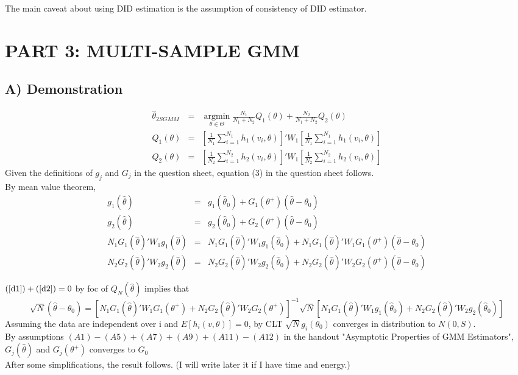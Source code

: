 \documentclass[11pt]{article}
\begin{document}
The main caveat about using DID estimation is the assumption of consistency of DID estimator. 
\section*{PART 3: MULTI-SAMPLE GMM}
\subsection*{A) Demonstration}
\begin{eqnarray}
\hat{\theta}_{2SGMM} &=& \underset{\theta \in \Theta}{\operatorname{argmin}} \frac{N_{1}}{N_{1}+N_{2}} Q_{1}(\theta)+ \frac{N_{2}}{N_{1}+N_{2}} Q_{2}(\theta) \nonumber \\
Q_{1}(\theta)        &=& \left[\frac{1}{N_{1}} \sum\limits_{i=1}^{N_{1}} h_{1}(v_{i},\theta)\right]' W_{1}\left[\frac{1}{N_{1}} \sum\limits_{i=1}^{N_{1}} h_{1}(v_{i},\theta)\right] \nonumber \\
Q_{2}(\theta)        &=& \left[\frac{1}{N_{2}} \sum\limits_{i=1}^{N_{2}} h_{2}(v_{i},\theta)\right]' W_{1}\left[\frac{1}{N_{2}} \sum\limits_{i=1}^{N_{2}} h_{2}(v_{i},\theta)\right] \nonumber 
\end{eqnarray}
Given the definitions of $g_{j}$ and $G_{j}$ in the question sheet, equation (3) in the question sheet follows. 
\\
By mean value theorem, 
\begin{eqnarray}
g_{1}(\hat{\theta}) &=& g_{1}(\hat{\theta}_{0}) + G_{1}(\theta^+)(\hat{\theta}-\theta_{0}) \nonumber \\
g_{2}(\hat{\theta}) &=& g_{2}(\hat{\theta}_{0}) + G_{2}(\theta^+)(\hat{\theta}-\theta_{0})
\nonumber \\
N_{1}G_{1}(\hat{\theta})'W_{1}g_{1}(\hat{\theta}) &=& N_{1}G_{1}(\hat{\theta})'W_{1}g_{1}(\hat{\theta}_{0}) + N_{1}G_{1}(\hat{\theta})'W_{1}G_{1}(\theta^+)(\hat{\theta}-\theta_{0}) \label{d1} \\ 
N_{2}G_{2}(\hat{\theta})'W_{2}g_{2}(\hat{\theta}) &=& N_{2}G_{2}(\hat{\theta})'W_{2}g_{2}(\hat{\theta}_{0}) + N_{2}G_{2}(\hat{\theta})'W_{2}G_{2}(\theta^+)(\hat{\theta}-\theta_{0}) \label{d2}
\end{eqnarray}

$(\ref{d1})+(\ref{d2})= 0$ by foc of $Q_{N}(\hat{\theta})$ implies that
\small
\begin{equation}
\sqrt{N}(\hat{\theta}-\theta_{0}) = \left[N_{1}G_{1}(\hat{\theta})'W_{1}G_{1}(\theta^+)+N_{2}G_{2}(\hat{\theta})'W_{2}G_{2}(\theta^+) \right]^{-1} \sqrt{N}\left[N_{1}G_{1}(\hat{\theta})'W_{1}g_{1}(\hat{\theta}_{0})+ N_{2}G_{2}(\hat{\theta})'W_{2}g_{2}(\hat{\theta}_{0}) \right] \nonumber
\end{equation}
\normalsize
Assuming the data are independent over i and $E[h_{i}(v,\theta)]=0$, by CLT $\sqrt{N}g_{i}(\theta_{0})$ converges in  distribution to $N(0,S)$.
\\
By assumptions $(A1)-(A5)+(A7)+(A9)+(A11)-(A12)$ in the handout "Asymptotic Properties of GMM Estimators", $G_{j}(\hat{\theta})$ and $G_{j}(\theta^+)$ converges to $G_{0}$
\\
After some simplifications, the result follows. (I will write later it if I have time and energy.) 
\end{document}

